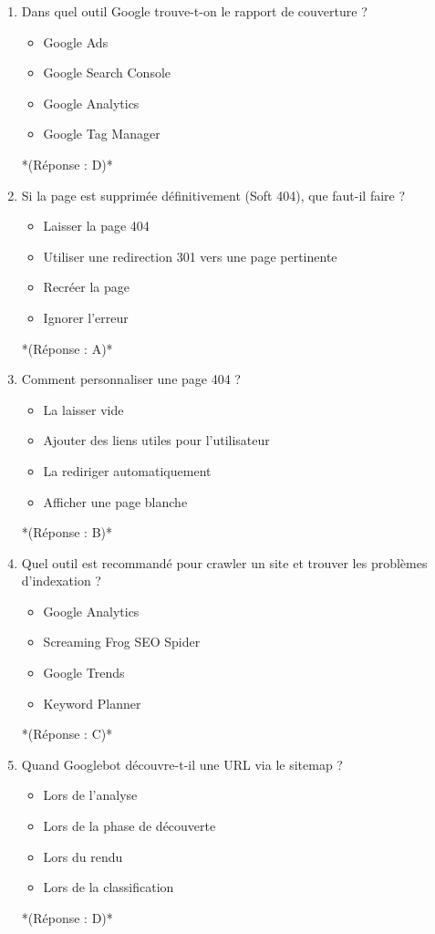 \documentclass[12pt,a4paper,twoside]{report}
\begin{document}
\begin{enumerate}
\item Dans quel outil Google trouve-t-on le rapport de couverture ?
\begin{itemize}
\item[A)] Google Ads
\item[B)] Google Search Console
\item[C)] Google Analytics
\item[D)] Google Tag Manager
\end{itemize}
*(Réponse : D)*

\item Si la page est supprimée définitivement (Soft 404), que faut-il faire ?
\begin{itemize}
\item[A)] Laisser la page 404
\item[B)] Utiliser une redirection 301 vers une page pertinente
\item[C)] Recréer la page
\item[D)] Ignorer l'erreur
\end{itemize}
*(Réponse : A)*

\item Comment personnaliser une page 404 ?
\begin{itemize}
\item[A)] La laisser vide
\item[B)] Ajouter des liens utiles pour l'utilisateur
\item[C)] La rediriger automatiquement
\item[D)] Afficher une page blanche
\end{itemize}
*(Réponse : B)*

\item Quel outil est recommandé pour crawler un site et trouver les problèmes d'indexation ?
\begin{itemize}
\item[A)] Google Analytics
\item[B)] Screaming Frog SEO Spider
\item[C)] Google Trends
\item[D)] Keyword Planner
\end{itemize}
*(Réponse : C)*

\item Quand Googlebot découvre-t-il une URL via le sitemap ?
\begin{itemize}
\item[A)] Lors de l'analyse
\item[B)] Lors de la phase de découverte
\item[C)] Lors du rendu
\item[D)] Lors de la classification
\end{itemize}
*(Réponse : D)*


\end{enumerate}
\end{document}
